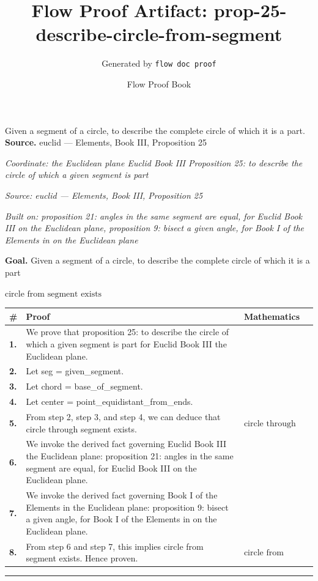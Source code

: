 \documentclass[11pt]{article}
\title{Flow Proof Artifact: prop-25-describe-circle-from-segment}
\author{Generated by \texttt{flow doc proof}}
\date{Flow Proof Book}
\theoremstyle{definition}
\begin{document}
\maketitle
Given a segment of a circle, to describe the complete circle of which it is a part.\\[0.5em]
\textbf{Source.} euclid — Elements, Book III, Proposition 25\\[0.5em]
\bigskip
{}\par
\smallskip\noindent\textit{Coordinate: the Euclidean plane \cdot Euclid Book III \cdot Proposition 25: to describe the circle of which a given segment is part}\par
\smallskip\noindent\textit{Source: euclid — Elements, Book III, Proposition 25}\par
\smallskip\noindent\textit{Built on: proposition 21: angles in the same segment are equal, for Euclid Book III on the Euclidean plane, proposition 9: bisect a given angle, for Book I of the Elements in on the Euclidean plane}\par
\medskip
\noindent\textbf{Goal.} Given a segment of a circle, to describe the complete circle of which it is a part\par
\noindent$\displaystyle \text{circle from segment exists}$\par
\medskip
\noindent
\begin{tabular}{@{} >{\raggedright\arraybackslash}p{} >{\raggedright\arraybackslash}p{} >{\raggedleft\arraybackslash}p{} @{}}
\textbf{\#} & \textbf{Proof} & \textbf{Mathematics} \\
\midrule
\textbf{1.} & We prove that proposition 25: to describe the circle of which a given segment is part for Euclid Book III the Euclidean plane. & \\[0.45em]
\textbf{2.} & Let seg = given\_segment. & \\[0.45em]
\textbf{3.} & Let chord = base\_of\_segment. & \\[0.45em]
\textbf{4.} & Let center = point\_equidistant\_from\_ends. & \\[0.45em]
\textbf{5.} & From step 2, step 3, and step 4, we can deduce that circle through segment exists. & $\displaystyle \text{circle through segment exists}$ \\[0.45em]
\textbf{6.} & We invoke the derived fact governing Euclid Book III the Euclidean plane: proposition 21: angles in the same segment are equal, for Euclid Book III on the Euclidean plane. & \\[0.45em]
\textbf{7.} & We invoke the derived fact governing Book I of the Elements in the Euclidean plane: proposition 9: bisect a given angle, for Book I of the Elements in on the Euclidean plane. & \\[0.45em]
\textbf{8.} & From step 6 and step 7, this implies circle from segment exists. Hence proven. & $\displaystyle \text{circle from segment exists}$ \\[0.45em]
\bottomrule
\end{tabular}
\label{thm:Geometry-Euclid Book III-proposition_25_to_describe_the_circle_of_which_a_given_segment_is_part}
\par\medskip\hrule
\end{document}
